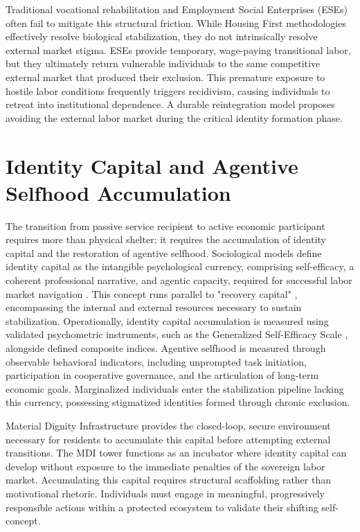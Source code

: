 \documentclass[12pt, letterpaper]{article}
\begin{document}
Traditional vocational rehabilitation and Employment Social Enterprises (ESEs) often fail to mitigate this structural friction. While Housing First methodologies \cite{tsemberis2004housing} effectively resolve biological stabilization, they do not intrinsically resolve external market stigma. ESEs provide temporary, wage-paying transitional labor, but they ultimately return vulnerable individuals to the same competitive external market that produced their exclusion. This premature exposure to hostile labor conditions frequently triggers recidivism, causing individuals to retreat into institutional dependence. A durable reintegration model proposes avoiding the external labor market during the critical identity formation phase.

\section{Identity Capital and Agentive Selfhood Accumulation}

The transition from passive service recipient to active economic participant requires more than physical shelter; it requires the accumulation of identity capital and the restoration of agentive selfhood. Sociological models define identity capital as the intangible psychological currency, comprising self-efficacy, a coherent professional narrative, and agentic capacity, required for successful labor market navigation \cite{cote2002social}. This concept runs parallel to "recovery capital" \cite{white2008recovery}, encompassing the internal and external resources necessary to sustain stabilization. Operationally, identity capital accumulation is measured using validated psychometric instruments, such as the Generalized Self-Efficacy Scale \cite{schwarzer1995generalized}, alongside defined composite indices. Agentive selfhood is measured through observable behavioral indicators, including unprompted task initiation, participation in cooperative governance, and the articulation of long-term economic goals. Marginalized individuals enter the stabilization pipeline lacking this currency, possessing stigmatized identities formed through chronic exclusion. 

Material Dignity Infrastructure provides the closed-loop, secure environment necessary for residents to accumulate this capital before attempting external transitions. The MDI tower functions as an incubator where identity capital can develop without exposure to the immediate penalties of the sovereign labor market. Accumulating this capital requires structural scaffolding rather than motivational rhetoric. Individuals must engage in meaningful, progressively responsible actions within a protected ecosystem to validate their shifting self-concept.
\end{document}
